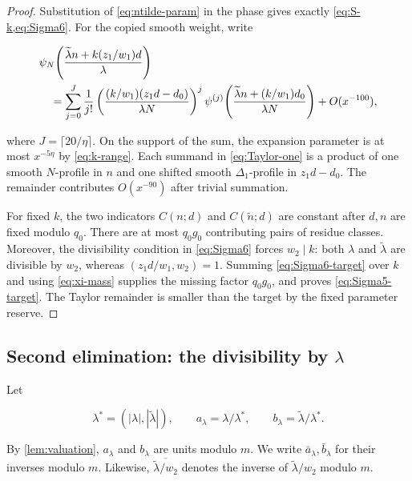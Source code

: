 \begin{proof}
Substitution of \cref{eq:ntilde-param} in the phase gives exactly
\cref{eq:S-k,eq:Sigma6}.  For the copied smooth weight, write

\begin{align}
 &\psi_N\!\left(
 \frac{\widetilde\lambda n+k(z_1/w_1)d}{\lambda}
 \right)\notag\\
 &\quad=
 \sum_{j=0}^{J}\frac1{j!}
 \left(\frac{(k/w_1)(z_1d-d_0)}{\lambda N}\right)^j
 \psi^{(j)}\!\left(
 \frac{\widetilde\lambda n+(k/w_1)d_0}{\lambda N}
 \right)+O(x^{-100}),
 \label{eq:Taylor-one}
\end{align}

where $J=\lceil20/\eta\rceil$.  On the support of the sum, the expansion
parameter is at most $x^{-5\eta}$ by \cref{eq:k-range}.  Each summand in
\cref{eq:Taylor-one} is a product of one smooth $N$-profile in $n$ and one
shifted smooth $\Delta_1$-profile in $z_1d-d_0$.  The remainder contributes
$O(x^{-90})$ after trivial summation.

For fixed $k$, the two indicators $C(n;d)$ and
$C(\widetilde n;d)$ are constant after $d,n$ are fixed modulo $q_0$.
There are at most $q_0g_0$ contributing pairs of residue classes.  Moreover,
the divisibility condition in \cref{eq:Sigma6} forces $w_2\mid k$: both
$\lambda$ and $\widetilde\lambda$ are divisible by $w_2$, whereas
$(z_1d/w_1,w_2)=1$.  Summing \cref{eq:Sigma6-target} over $k$ and using
\cref{eq:xi-mass} supplies the missing factor $q_0g_0$, and proves
\cref{eq:Sigma5-target}.  The Taylor remainder is smaller than the target by
the fixed parameter reserve.
\end{proof}

\subsection{Second elimination: the divisibility by
\texorpdfstring{$\lambda$}{lambda}}

Let

\begin{equation}\label{eq:lambda-star}
 \lambda^*=(|\lambda|,|\widetilde\lambda|),\qquad
 a_\lambda=\lambda/\lambda^*,\qquad
 b_\lambda=\widetilde\lambda/\lambda^*.
\end{equation}

By \cref{lem:valuation}, $a_\lambda$ and $b_\lambda$ are units modulo $m$.
We write $\bar a_\lambda,\bar b_\lambda$ for their inverses modulo $m$.
Likewise, $\overline{\widetilde\lambda/w_2}$ denotes the inverse of
$\widetilde\lambda/w_2$ modulo $m$.

